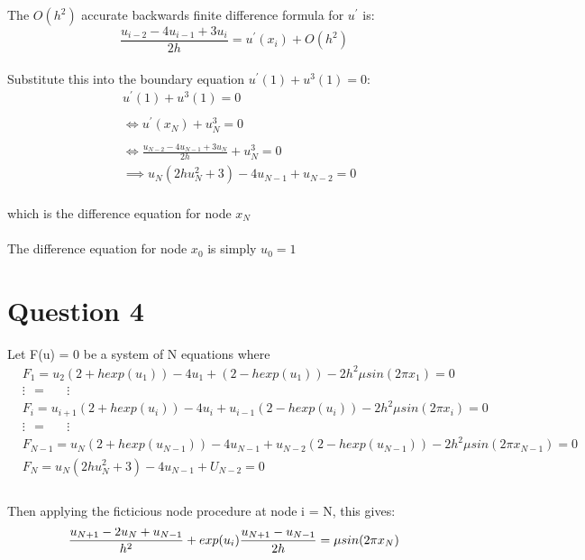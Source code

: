 \documentclass[fleqn]{report}
\begin{document}
The $O(h^2)$ accurate backwards finite difference formula for $u^{\prime}$ is:
\begin{equation}
\frac{u_{i-2} - 4u_{i-1} + 3u_i}{2h} = u^{\prime}(x_i) + O(h^2)
\end{equation}
\\
Substitute this into the boundary equation $u^{\prime}(1) + u^3(1) = 0$:
\begin{equation}
\begin{split}
&u^{\prime}(1) + u^3(1) = 0\\\\
&\iff u^{\prime}(x_N) + u_N^3 = 0\\\\
&\iff \frac{u_{N-2} - 4u_{N-1} + 3u_N}{2h} + u_N^3 = 0\\
&\implies u_N(2hu_N^2 + 3) - 4u_{N-1} + u_{N-2} = 0
\end{split}
\end{equation}
\\
which is the difference equation for node $x_N$\\\\
The difference equation for node $x_0$ is simply $u_0 = 1$

\section{Question 4}

Let F(u) = 0 be a system of N equations where
\begin{equation}
\begin{split} 
&F_1 = u_{2}(2 + hexp(u_1)) - 4u_1 + (2 - hexp(u_1)) - 2h^2\mu sin(2 \pi x_1) = 0  \\
&\vdots \ \ = \ \ \ \ \ \ \                   \vdots\\
&F_i =  u_{i+1}(2 + hexp(u_i)) - 4u_i + u_{i-1}(2 - hexp(u_i)) - 2h^2\mu sin(2 \pi x_i) = 0  \\
&\vdots \ \ = \ \ \ \ \ \ \                   \vdots\\
    &F_{N-1} =  u_{N}(2 + hexp(u_{N-1})) - 4u_{N-1} + u_{N-2}(2 - hexp(u_{N-1})) - 2h^2\mu sin(2 \pi x_{N-1}) = 0\\
&F_N = u_N(2hu^2_N + 3) - 4u_{N-1} + U_{N-2} = 0\\
    \end{split}
\end{equation}
\\

Then applying the ficticious node procedure at node i = N, this gives:
\begin{equation}
\frac{u_{N+1} - 2u_N + u_{N-1}}{h^2} + exp(u_i)\frac{u_{N+1} - u_{N-1}}{2h} = \mu sin(2 \pi x_N)\\\\
\end{equation}
\end{document}
